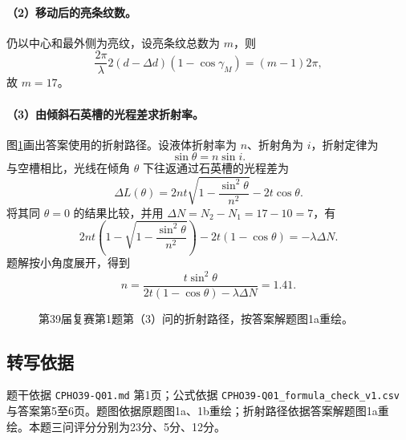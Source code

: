 \paragraph{（2）移动后的亮条纹数。}
仍以中心和最外侧为亮纹，设亮条纹总数为 $m$，则
\[
\frac{2\pi}{\lambda}2(d-\Delta d)(1-\cos\gamma_M)=(m-1)2\pi,
\]
故 \(\boxed{m=17}\)。

\paragraph{（3）由倾斜石英槽的光程差求折射率。}
图\ref{fig:cpho39q01refraction}画出答案使用的折射路径。设液体折射率为 $n$、折射角为 $i$，折射定律为
\[
\sin\theta=n\sin i.
\]
与空槽相比，光线在倾角 $\theta$ 下往返通过石英槽的光程差为
\[
\Delta L(\theta)=2nt\sqrt{1-\frac{\sin^2\theta}{n^2}}-2t\cos\theta.
\]
将其同 $\theta=0$ 的结果比较，并用 $\Delta N=N_2-N_1=17-10=7$，有
\[
2nt\left(1-\sqrt{1-\frac{\sin^2\theta}{n^2}}\right)-2t(1-\cos\theta)=-\lambda\Delta N.
\]
题解按小角度展开，得到
\[
\boxed{n=\frac{t\sin^2\theta}{2t(1-\cos\theta)-\lambda\Delta N}=1.41.}
\]
\begin{figure}[htbp]
  \centering
  
  \caption{第39届复赛第1题第（3）问的折射路径，按答案解题图1a重绘。}
  \label{fig:cpho39q01refraction}
\end{figure}

\subsection{转写依据}
题干依据 \texttt{CPHO39-Q01.md} 第1页；公式依据 \texttt{CPHO39-Q01\_formula\_check\_v1.csv} 与答案第5至6页。题图依据原题图1a、1b重绘；折射路径依据答案解题图1a重绘。本题三问评分分别为23分、5分、12分。

